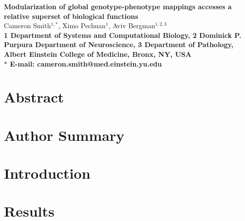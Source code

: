 



\let\ref\autoref

\begin{flushleft}
{\Large
\textbf{Modularization of global genotype-phenotype mappings accesses a relative superset of biological functions}
}
\\
Cameron Smith$^{1, \ast}$,
Ximo Pechuan$^{1}$,
Aviv Bergman$^{1,2,3}$
\\
\bf{1} Department of Systems and Computational Biology,
\bf{2} Dominick P. Purpura Department of Neuroscience,
\bf{3} Department of Pathology, Albert Einstein College of Medicine, Bronx, NY, USA
\\
$\ast$ E-mail: cameron.smith@med.einstein.yu.edu
\end{flushleft}

\section{Abstract}


\section{Author Summary}


\section{Introduction}


\section{Results}


